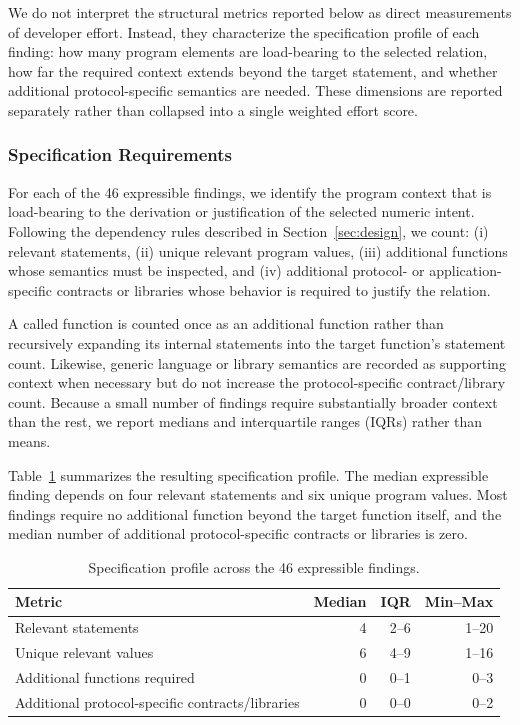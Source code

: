 \documentclass[pdflatex,sn-basic]{sn-jnl}%
\theoremstyle{thmstyleone}%
\theoremstyle{thmstyletwo}%
\theoremstyle{thmstylethree}%
\begin{document}
We do not interpret the structural metrics reported below as direct measurements of
developer effort. Instead, they characterize the specification profile of each finding:
how many program elements are load-bearing to the selected relation, how far the
required context extends beyond the target statement, and whether additional
protocol-specific semantics are needed. These dimensions are reported separately
rather than collapsed into a single weighted effort score.


\subsubsection{Specification Requirements}\label{sec:rq2:spec}

For each of the 46 expressible findings, we identify the program context that is
load-bearing to the derivation or justification of the selected numeric intent.
Following the dependency rules described in Section~\ref{sec:design}, we count:
(i) relevant statements,
(ii) unique relevant program values,
(iii) additional functions whose semantics must be inspected, and
(iv) additional protocol- or application-specific contracts or libraries whose
behavior is required to justify the relation.

A called function is counted once as an additional function rather than recursively
expanding its internal statements into the target function's statement count.
Likewise, generic language or library semantics are recorded as supporting context
when necessary but do not increase the protocol-specific contract/library count.
Because a small number of findings require substantially broader context than the
rest, we report medians and interquartile ranges (IQRs) rather than means.

Table~\ref{tab:rq2-profile} summarizes the resulting specification profile.
The median expressible finding depends on four relevant statements and six unique
program values. Most findings require no additional function beyond the target
function itself, and the median number of additional protocol-specific
contracts or libraries is zero.

\begin{table}[t]
\centering
\caption{Specification profile across the 46 expressible findings.}
\label{tab:rq2-profile}
\small
\begin{tabular}{lrrr}
\toprule
\textbf{Metric} & \textbf{Median} & \textbf{IQR} & \textbf{Min--Max} \\
\midrule
Relevant statements                              & 4 & 2--6 & 1--20 \\
Unique relevant values                           & 6 & 4--9 & 1--16 \\
Additional functions required                    & 0 & 0--1 & 0--3 \\
Additional protocol-specific contracts/libraries & 0 & 0--0 & 0--2 \\
\bottomrule
\end{tabular}
\end{table}
\end{document}
